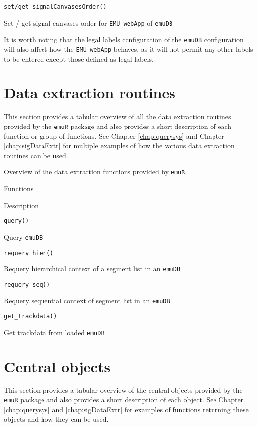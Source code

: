 \documentclass[
]{book}
\begin{document}
\texttt{set/get\_signalCanvasesOrder()}

Set / get signal canvases order for \texttt{EMU-webApp} of \texttt{emuDB}

It is worth noting that the legal labels configuration of the \texttt{emuDB} configuration will also affect how the \texttt{EMU-webApp} behaves, as it will not permit any other labels to be entered except those defined as legal labels.

\hypertarget{sec:emuRpackageDetails-dataExtr}{%
\section{Data extraction routines}\label{sec:emuRpackageDetails-dataExtr}}

This section provides a tabular overview of all the data extraction routines provided by the \texttt{emuR} package and also provides a short description of each function or group of functions. See Chapter \ref{chap:querysys} and Chapter \ref{chap:sigDataExtr} for multiple examples of how the various data extraction routines can be used.

\label{tab:emuRpackageDetails-dataExtr}Overview of the data extraction functions provided by \texttt{emuR}.

Functions

Description

\texttt{query()}

Query \texttt{emuDB}

\texttt{requery\_hier()}

Requery hierarchical context of a segment list in an \texttt{emuDB}

\texttt{requery\_seq()}

Requery sequential context of segment list in an \texttt{emuDB}

\texttt{get\_trackdata()}

Get trackdata from loaded \texttt{emuDB}

\hypertarget{sec:emuRpackageDetails-centralObjects}{%
\section{Central objects}\label{sec:emuRpackageDetails-centralObjects}}

This section provides a tabular overview of the central objects provided by the \texttt{emuR} package and also provides a short description of each object. See Chapter \ref{chap:querysys} and \ref{chap:sigDataExtr} for examples of functions returning these objects and how they can be used.
\end{document}
